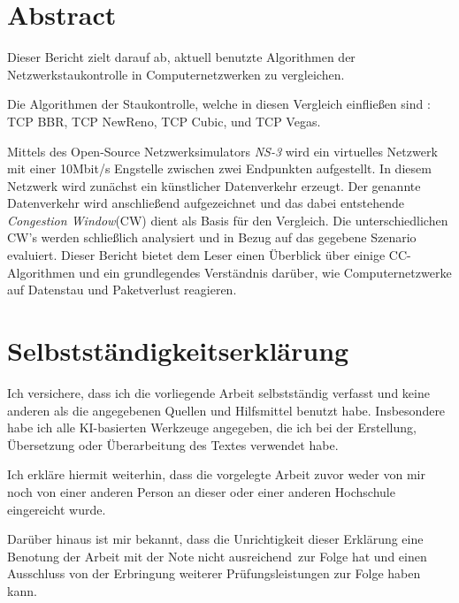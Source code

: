 \documentclass[paper=a4,fontsize=12pt,ngerman]{scrartcl}
\begin{document}
\pagestyle{plain}



\section*{Abstract}



Dieser Bericht zielt darauf ab, aktuell benutzte Algorithmen der Netzwerkstaukontrolle in Computernetzwerken 
zu vergleichen.

Die Algorithmen der Staukontrolle, welche in diesen Vergleich einfließen sind : TCP BBR,
TCP NewReno, TCP Cubic, und TCP Vegas.  \newline

Mittels des Open-Source Netzwerksimulators \textit{NS-3} wird ein virtuelles Netzwerk mit einer 10Mbit/s Engstelle zwischen zwei Endpunkten aufgestellt. 
In diesem Netzwerk wird zunächst ein künstlicher Datenverkehr erzeugt.
Der genannte Datenverkehr wird anschließend aufgezeichnet und das dabei entstehende \textit{Congestion Window}(CW) dient als Basis für den Vergleich.
Die unterschiedlichen CW's werden schließlich analysiert und in Bezug auf das gegebene Szenario evaluiert.
Dieser Bericht bietet dem Leser einen Überblick über einige CC-Algorithmen und ein grundlegendes Verständnis darüber, wie Computernetzwerke auf Datenstau und 
Paketverlust reagieren.




\newpage
\section*{Selbstständigkeitserklärung}
Ich versichere, dass ich die vorliegende Arbeit selbstständig verfasst und 
keine anderen als die angegebenen Quellen und Hilfsmittel benutzt habe.
Insbesondere habe ich alle KI-basierten Werkzeuge angegeben, die ich bei
der Erstellung, Übersetzung oder Überarbeitung des Textes verwendet habe.

Ich erkläre hiermit weiterhin, dass die vorgelegte Arbeit zuvor weder von mir 
noch von einer anderen Person an dieser oder einer anderen Hochschule 
eingereicht wurde.

Darüber hinaus ist mir bekannt, dass die Unrichtigkeit dieser Erklärung eine 
Benotung der Arbeit mit der Note \glqq nicht ausreichend\grqq \ zur Folge hat 
und einen Ausschluss von der Erbringung weiterer Prüfungsleistungen zur Folge 
haben kann.
\bigskip
 
\end{document}
